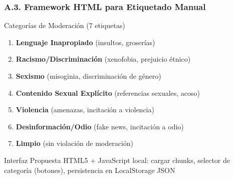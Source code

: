 \documentclass[aspectratio=169,10pt]{beamer}
\begin{document}
\begin{frame}
  \frametitle{A.3. Framework HTML para Etiquetado Manual}
  
  \begin{block}{Categorías de Moderación (7 etiquetas)}
    \begin{enumerate}
      \item \textbf{Lenguaje Inapropiado} (insultos, groserías)
      \item \textbf{Racismo/Discriminación} (xenofobia, prejuicio étnico)
      \item \textbf{Sexismo} (misoginia, discriminación de género)
      \item \textbf{Contenido Sexual Explícito} (referencias sexuales, acoso)
      \item \textbf{Violencia} (amenazas, incitación a violencia)
      \item \textbf{Desinformación/Odio} (fake news, incitación a odio)
      \item \textbf{Limpio} (sin violación de moderación)
    \end{enumerate}
  \end{block}

  \begin{block}{Interfaz Propuesta}
    HTML5 + JavaScript local: cargar chunks, selector de categoría (botones), persistencia en LocalStorage JSON
  \end{block}
\end{frame}
\end{document}
